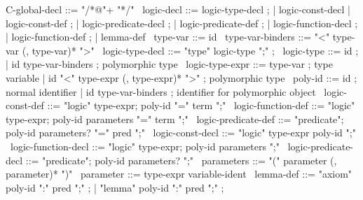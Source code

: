 \begin{syntax}
  C-global-decl ::= "/*@"+ "*/"
  \
  logic-decl ::= logic-type-decl ;
          | logic-const-decl | logic-const-def ;
          | logic-predicate-decl ;
          | logic-predicate-def ;
          | logic-function-decl ;
          | logic-function-def ;
          | lemma-def
  \
  type-var ::= id
  \
  type-var-binders ::= "<" type-var (, type-var)* ">"
  \
  logic-type-decl ::= "type" logic-type ";" ;
  \
  logic-type ::= id ;
  | id type-var-binders ; polymorphic type
  \
  logic-type-expr ::= type-var ; type variable
  | id "<" type-expr (, type-expr)* ">" ; polymorphic type
  \
  poly-id ::= id ; normal identifier
  | id type-var-binders ; identifier for polymorphic object
  \
  logic-const-def ::= "logic" type-expr;
    poly-id "=" term ";"
  \
  logic-function-def ::= "logic" type-expr;
  poly-id parameters "=" term ";"
  \
  logic-predicate-def ::=
  "predicate";
  poly-id parameters? "=" pred ";"
  \
  logic-const-decl ::=  "logic" type-expr poly-id ";"
  \
  logic-function-decl ::=
  "logic" type-expr;
  poly-id parameters ";"
  \
  logic-predicate-decl ::=
  "predicate";
  poly-id parameters? ";"
  \
  parameters ::= "(" parameter (, parameter)* ")"
  \
  parameter ::= type-expr variable-ident
  \
  lemma-def ::= "axiom" poly-id ":" pred ";" ;
  | "lemma" poly-id ":" pred ";" ;
\end{syntax}